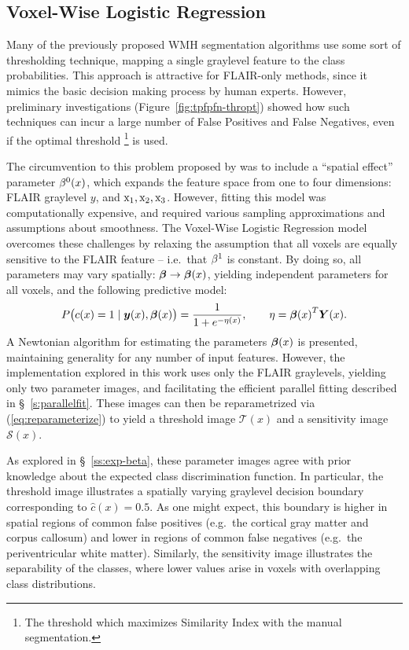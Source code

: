 \subsection{Voxel-Wise Logistic Regression}
Many of the previously proposed WMH segmentation algorithms use some sort of thresholding technique,
mapping a single graylevel feature to the class probabilities.
This approach is attractive for FLAIR-only methods,
since it mimics the basic decision making process by human experts.
However, preliminary investigations (Figure~\ref{fig:tpfpfn-thropt}) showed how
such techniques can incur a large number of False Positives and False Negatives,
even if the optimal threshold%
\footnote{The threshold which maximizes Similarity Index with the manual segmentation.}
is used.
\par
The circumvention to this problem proposed by \citeauthor{Schmidt2017a}
was to include a ``spatial effect'' parameter $\beta^0(x)$,
which expands the feature space from one to four dimensions:
FLAIR graylevel $y$, and $\mathrm{x}_1,\mathrm{x}_2,\mathrm{x}_3$.
However, fitting this model was computationally expensive,
and required various sampling approximations and assumptions about smoothness.
The Voxel-Wise Logistic Regression model overcomes these challenges
by relaxing the assumption that all voxels are equally sensitive to the FLAIR feature
-- i.e.\ that $\beta^1$ is constant.
By doing so, all parameters may vary spatially: $\bm{\beta} \rightarrow \bm{\beta}(x)$,
yielding independent parameters for all voxels,
and the following predictive model:
\begin{equation}
P\big(c(x)=1\mid\by(x),\bb(x)\big) = \frac{1}{1+e^{-\eta(x)}},\qquad\eta = {\bb(x)}^T\bm{Y}(x).%
\label{eq:eq:vlrmodel-conc}
\end{equation}
A Newtonian algorithm for estimating the parameters $\bm{\beta}(x)$ is presented,
maintaining generality for any number of input features.
However, the implementation explored in this work uses only the FLAIR graylevels,
yielding only two parameter images,
and facilitating the efficient parallel fitting described in \S~\ref{s:parallelfit}.
These images can then be reparametrized via (\ref{eq:reparameterize}) to yield
a threshold image $\mathcal{T}(x)$
and a sensitivity image $\mathcal{S}(x)$.
\par
As explored in \S~\ref{ss:exp-beta}, these parameter images
agree with prior knowledge about the expected class discrimination function.
In particular, the threshold image illustrates a spatially varying graylevel decision boundary
corresponding to $\hat{c}(x) = 0.5$.
As one might expect, this boundary is higher in spatial regions of common false positives
(e.g.\ the cortical gray matter and corpus callosum)
and lower in regions of common false negatives
(e.g.\ the periventricular white matter).
Similarly, the sensitivity image illustrates the separability of the classes,
where lower values arise in voxels with overlapping class distributions.
